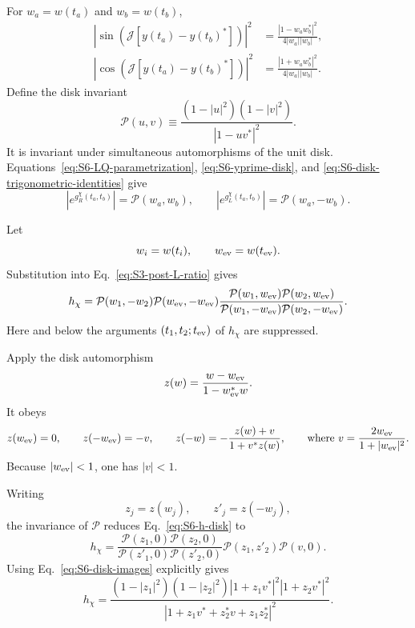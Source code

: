 \documentclass[11pt,a4paper]{article}
\begin{document}
For \(w_a=w(t_a)\) and \(w_b=w(t_b)\),
\begin{equation}
\begin{aligned}
\left|
\sin\left(
\mathcal J[y(t_a)-y(t_b)^*]
\right)
\right|^2
&=
\frac{
|1-w_aw_b^*|^2
}{
4|w_a||w_b|
},
\\
\left|
\cos\left(
\mathcal J[y(t_a)-y(t_b)^*]
\right)
\right|^2
&=
\frac{
|1+w_aw_b^*|^2
}{
4|w_a||w_b|
}.
\end{aligned}
\label{eq:S6-disk-trigonometric-identities}
\end{equation}
Define the disk invariant
\begin{equation}
\mathcal P(u,v)
\equiv
\frac{
(1-|u|^2)(1-|v|^2)
}{
|1-uv^*|^2
}.
\label{eq:S6-disk-kernel}
\end{equation}
It is invariant under simultaneous automorphisms of the unit disk.
Equations~\eqref{eq:S6-LQ-parametrization},
\eqref{eq:S6-yprime-disk}, and
\eqref{eq:S6-disk-trigonometric-identities} give
\begin{equation}
\left|e^{g^\chi_R(t_a,t_b)}\right|
=
\mathcal P(w_a,w_b),
\qquad
\left|e^{g^\chi_L(t_a,t_b)}\right|
=
\mathcal P(w_a,-w_b).
\label{eq:S6-correlators-disk}
\end{equation}

Let
\begin{equation}
w_i=w(t_i),
\qquad
w_{\rm ev}=w(t_{\rm ev}).
\end{equation}
Substitution into Eq.~\eqref{eq:S3-post-L-ratio} gives
\begin{equation}
h_\chi
=\mathcal P(w_1,-w_2)
\mathcal P(w_{\rm ev},-w_{\rm ev})
\frac{\mathcal P(w_1,w_{\rm ev})
\mathcal P(w_2,w_{\rm ev})
}{
\mathcal P(w_1,-w_{\rm ev})
\mathcal P(w_2,-w_{\rm ev})
}.
\label{eq:S6-h-disk}
\end{equation}
Here and below the arguments
\((t_1,t_2;t_{\rm ev})\) of \(h_\chi\) are suppressed.

Apply the disk automorphism
\begin{equation}
z(w)
=
\frac{
w-w_{\rm ev}
}{
1-w_{\rm ev}^*w
}.
\label{eq:S6-disk-automorphism}
\end{equation}
It obeys
\begin{equation}
z(w_{\rm ev})=0,
\qquad
z(-w_{\rm ev})=-v,
\qquad
z(-w)
=
-\frac{
z(w)+v
}{
1+v^*z(w)
}, \qquad {\text{where~}}
v
=
\frac{
2w_{\rm ev}
}{
1+|w_{\rm ev}|^2
}.
\label{eq:S6-disk-images}
\end{equation}
Because \(|w_{\rm ev}|<1\), one has \(|v|<1\).

Writing
\begin{equation}
z_j=z(w_j),
\qquad
z'_j=z(-w_j),
\end{equation}
the invariance of \(\mathcal P\) reduces Eq.~\eqref{eq:S6-h-disk} to
\begin{equation}
h_\chi
=
\frac{
\mathcal P(z_1,0)\mathcal P(z_2,0)
}{
\mathcal P(z'_1,0)\mathcal P(z'_2,0)
}
\mathcal P(z_1,z'_2)\mathcal P(v,0).
\label{eq:S6-h-transformed}
\end{equation}
Using Eq.~\eqref{eq:S6-disk-images} explicitly gives
\begin{equation}
h_\chi
=
\frac{
(1-|z_1|^2)(1-|z_2|^2)
|1+z_1v^*|^2
|1+z_2v^*|^2
}{
|1+z_1v^*+z_2^*v+z_1z_2^*|^2
}.
\label{eq:S6-h-z}
\end{equation}
\end{document}
